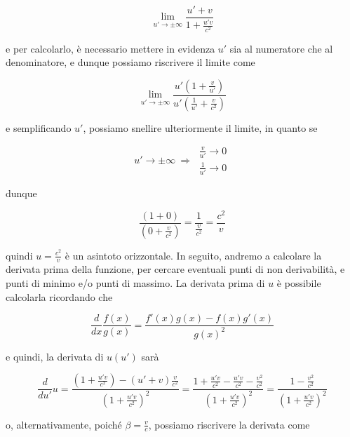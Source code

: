 \documentclass{article}
\begin{document}
\begin{equation}
    \lim_{u' \rightarrow \pm \infty}{\frac{u' + v}{1 + \frac{u'v}{c^2}}}
\end{equation}

e per calcolarlo, è necessario mettere in evidenza \(u'\) sia al numeratore
che al denominatore, e dunque possiamo riscrivere il limite come

\begin{equation}
    \lim_{u' \rightarrow \pm \infty}{\frac{u'(1 + \frac{v}{u'})}{u'(\frac{1}{u'} + \frac{v}{c^2})}}
\end{equation}

e semplificando \(u'\), possiamo snellire ulteriormente il limite,
in quanto se

\begin{equation}
    u' \rightarrow \pm \infty\ \Rightarrow\
    \begin{aligned}
        \frac{v}{u'} \rightarrow 0 \\
        \frac{1}{u'} \rightarrow 0
    \end{aligned}
\end{equation}

dunque

\begin{equation}
    \frac{(1 + 0)}{(0 + \frac{v}{c^2})} = \frac{1}{\frac{v}{c^2}} = \frac{c^2}{v}
\end{equation}

quindi \(u = \frac{c^2}{v}\) è un asintoto orizzontale. In seguito,
andremo a calcolare la derivata prima della funzione, per cercare
eventuali punti di non derivabilità, e punti di minimo e/o punti di massimo.
La derivata prima di \(u\) è possibile calcolarla ricordando che

\begin{equation}
    \frac{d}{dx} \frac{f(x)}{g(x)} = \frac{f'(x) g(x) - f(x) g'(x)}{g(x)^2}
\end{equation}

e quindi, la derivata di \(u(u')\) sarà

\begin{equation}
    \frac{d}{du'} u = \frac{(1 + \frac{u'v}{c^2}) - (u' + v) \frac{v}{c^2}}{\left(1 + \frac{u'v}{c^2}\right)^2} = \frac{1 + \frac{u'v}{c^2} - \frac{u'v}{c^2} - \frac{v^2}{c^2}}{\left(1 + \frac{u'v}{c^2}\right)^2} = \frac{1 - \frac{v^2}{c^2}}{\left(1 + \frac{u'v}{c^2}\right)^2}
\end{equation}

o, alternativamente, poiché \(\beta = \frac{v}{c}\), possiamo
riscrivere la derivata come
\end{document}
